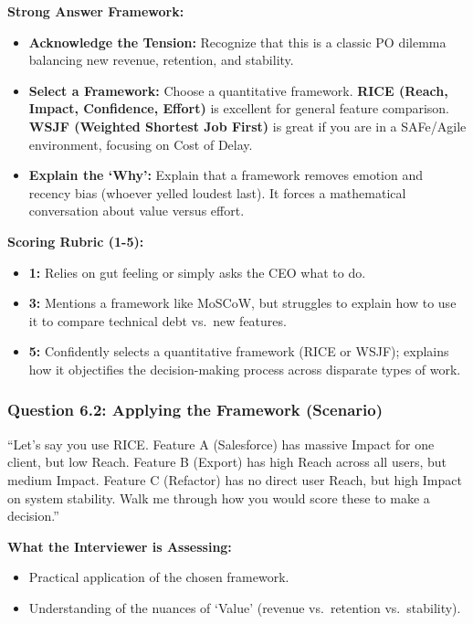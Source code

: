 \documentclass[
  11pt,
  openany,
  oneside]{book}
\providecommand{\tightlist}{%
  \setlength{\itemsep}{0pt}\setlength{\parskip}{0pt}}
\begin{document}
\textbf{Strong Answer Framework:}

\begin{itemize}
\tightlist
\item
  \textbf{Acknowledge the Tension:} Recognize that this is a classic PO
  dilemma balancing new revenue, retention, and stability.
\item
  \textbf{Select a Framework:} Choose a quantitative framework.
  \textbf{RICE (Reach, Impact, Confidence, Effort)} is excellent for
  general feature comparison. \textbf{WSJF (Weighted Shortest Job
  First)} is great if you are in a SAFe/Agile environment, focusing on
  Cost of Delay.
\item
  \textbf{Explain the `Why':} Explain that a framework removes emotion
  and recency bias (whoever yelled loudest last). It forces a
  mathematical conversation about value versus effort.
\end{itemize}

\textbf{Scoring Rubric (1-5):}

\begin{itemize}
\tightlist
\item
  \textbf{1:} Relies on gut feeling or simply asks the CEO what to do.
\item
  \textbf{3:} Mentions a framework like MoSCoW, but struggles to explain
  how to use it to compare technical debt vs.~new features.
\item
  \textbf{5:} Confidently selects a quantitative framework (RICE or
  WSJF); explains how it objectifies the decision-making process across
  disparate types of work.
\end{itemize}

\subsubsection{Question 6.2: Applying the Framework
(Scenario)}\label{question-6.2-applying-the-framework-scenario}

``Let's say you use RICE. Feature A (Salesforce) has massive Impact for
one client, but low Reach. Feature B (Export) has high Reach across all
users, but medium Impact. Feature C (Refactor) has no direct user Reach,
but high Impact on system stability. Walk me through how you would score
these to make a decision.''

\textbf{What the Interviewer is Assessing:}

\begin{itemize}
\tightlist
\item
  Practical application of the chosen framework.
\item
  Understanding of the nuances of `Value' (revenue vs.~retention
  vs.~stability).
\end{itemize}
\end{document}

